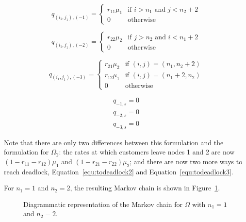 \documentclass{article}
\numberwithin{equation}{section}
\begin{document}
\begin{equation}\label{equ:todeadlock2}
  q_{(i_1, j_1), (-1)} = \left\{
  \begin{array}{rr}
    r_{11}\mu_1 & \text{if } i > n_1 \text{ and } j < n_2 + 2 \\
    0 & \text{otherwise}
  \end{array}
  \right.
\end{equation}

\begin{equation}\label{equ:todeadlock3}
  q_{(i_1, j_1), (-2)} = \left\{
  \begin{array}{rr}
    r_{22}\mu_2 & \text{if } j > n_2 \text{ and } i < n_1 + 2 \\
    0 & \text{otherwise}
  \end{array}
  \right.
\end{equation}

\begin{equation}\label{eqn:2nssfB}
  q_{(i_1, j_1), (-3)} = \left\{
  \begin{array}{rr}
    r_{21}\mu_2 & \text{if } (i, j) = (n_1, n_2 + 2) \\
    r_{12}\mu_1 & \text{if } (i, j) = (n_1 + 2, n_2) \\
    0 & \text{otherwise}
  \end{array}
  \right.
\end{equation}

\begin{align}
  q_{-1, s} = 0 \\
  q_{-2, s} = 0 \\
  q_{-3, s} = 0
\end{align}

Note that there are only two differences between this formulation and the
formulation for $\Omega_2$: the rates at which customers leave nodes 1 and 2
are now $(1-r_{11}-r_{12})\mu_1$ and $(1-r_{21}-r_{22})\mu_2$; and there are
now two more ways to reach deadlock, Equation~\ref{equ:todeadlock2} and
Equation~\ref{equ:todeadlock3}.

For $n_1 = 1$ and $n_2 = 2$, the resulting Markov chain is shown in
Figure~\ref{fig:2nodeMCfeedback}.

\begin{figure}[!htbp]
    \begin{center}
    
    \end{center}
    \caption{Diagrammatic representation of the Markov chain for $\Omega$ with
    $n_1=1$ and $n_2=2$.}
    \label{fig:2nodeMCfeedback}
\end{figure}
\end{document}
